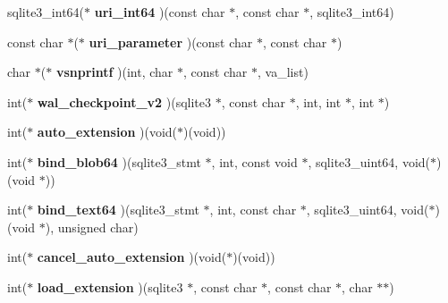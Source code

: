 \begin{DoxyCompactItemize}
sqlite3\+\_\+int64($\ast$ {\bfseries uri\+\_\+int64} )(const char $\ast$, const char $\ast$, sqlite3\+\_\+int64)
\item 
\mbox{\label{structsqlite3__api__routines_add5f520297676876e836eec5c976c6ba}} 
const char $\ast$($\ast$ {\bfseries uri\+\_\+parameter} )(const char $\ast$, const char $\ast$)
\item 
\mbox{\label{structsqlite3__api__routines_aa6b21fe467cc3eabacec66d2d1f9bf4f}} 
char $\ast$($\ast$ {\bfseries vsnprintf} )(int, char $\ast$, const char $\ast$, va\+\_\+list)
\item 
\mbox{\label{structsqlite3__api__routines_a86ce375053098d8fbb2d686e9d98d12e}} 
int($\ast$ {\bfseries wal\+\_\+checkpoint\+\_\+v2} )(sqlite3 $\ast$, const char $\ast$, int, int $\ast$, int $\ast$)
\item 
\mbox{\label{structsqlite3__api__routines_a19d7b88cb46d7c9984c681eaf3ebf1a6}} 
int($\ast$ {\bfseries auto\+\_\+extension} )(void($\ast$)(void))
\item 
\mbox{\label{structsqlite3__api__routines_aa34e69966762f91f4570cee3cb8f630f}} 
int($\ast$ {\bfseries bind\+\_\+blob64} )(sqlite3\+\_\+stmt $\ast$, int, const void $\ast$, sqlite3\+\_\+uint64, void($\ast$)(void $\ast$))
\item 
\mbox{\label{structsqlite3__api__routines_aab0cca7b94c71fa0e335cdbb17820ab5}} 
int($\ast$ {\bfseries bind\+\_\+text64} )(sqlite3\+\_\+stmt $\ast$, int, const char $\ast$, sqlite3\+\_\+uint64, void($\ast$)(void $\ast$), unsigned char)
\item 
\mbox{\label{structsqlite3__api__routines_ad2af85260429714c4bde212f2d0f0516}} 
int($\ast$ {\bfseries cancel\+\_\+auto\+\_\+extension} )(void($\ast$)(void))
\item 
\mbox{\label{structsqlite3__api__routines_a33eef15b418c498b26cd052daf668f01}} 
int($\ast$ {\bfseries load\+\_\+extension} )(sqlite3 $\ast$, const char $\ast$, const char $\ast$, char $\ast$$\ast$)
\item 
$$
\end{DoxyCompactItemize}
